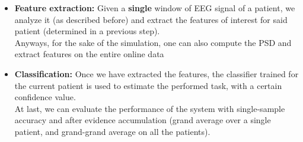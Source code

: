\begin{itemize}
\item \textbf{Feature extraction:} Given a \textbf{single} window of EEG signal of a patient, we analyze it (as described before) and extract the features of interest for said patient (determined in a previous step). \\
Anyways, for the sake of the simulation, one can also compute the PSD and extract features on the entire online data
\item \textbf{Classification:} Once we have extracted the features, the classifier trained for the current patient is used to estimate the performed task, with a certain confidence value. \\
At last, we can evaluate the performance of the system with single-sample accuracy and after evidence accumulation (grand average over a single patient, and grand-grand average on all the patients).
\end{itemize}